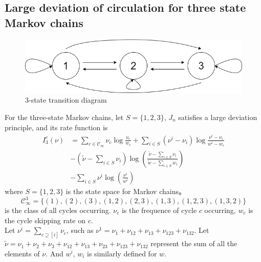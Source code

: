 \documentclass[11pt,en,cite=authoryear]{elegantpaper}
\begin{document}
\subsection{Large deviation of circulation for three state Markov chains}

\begin{theorem}
    \begin{figure}[h]
        \centering
        \includegraphics[scale=0.3]{3-state.png}
        \caption{3-state transition diagram}
    \end{figure}

For the three-state Markov chains, let $S = \{1, 2, 3\}$, $J_{n}$ satisfies a large deviation principle, and its rate function is
\begin{align}
    I_3^c(\nu) &= \sum_{c \in \mathcal{C}_{\infty}} \nu_{c} \log \frac{\nu_{c}}{w_c} + \sum_{i\in S}(\nu^i - \nu_i)\log \frac{\nu^i - \nu_i}{w^i - w_i} \\
    &-(\tilde{\nu} - \sum_{i\in S}\nu_i)\log(\frac{\tilde{\nu} - \sum_{i\in S}\nu_i}{\tilde{w} - \sum_{i\in S}w_i}) \\
    &-\sum_{i\in S} \nu^i \log (\frac{\nu^i}{w^i})
\end{align}
where $S=\{1, 2, 3\}$ is the state space for Markov chains。
$$\mathcal{C}_{\infty}^3 = \{(1), (2), (3), (1,2), (2,3), (1,3), (1,2,3), (1,3,2)\}$$
is the class of all cycles occurring.
$\nu_c$ is the frequence of cycle $c$ occurring, $w_c$ is the cycle skipping rate on $c$.\\
Let $\nu^{i} = \sum_{c \supseteq [i]} \nu_{c}$, such as $\nu^{1} = \nu_{1} + \nu_{12} + \nu_{13} + \nu_{123} +\nu_{132}$.
Let  $\tilde{\nu} = \nu_{1} + \nu_{2} + \nu_{3} + \nu_{12} + \nu_{13} + \nu_{23} + \nu_{123} +\nu_{132}$ represent the sum of all the elements of $\nu$. 
And $w^i$, $w_i$ is similarly defined for $w$.
\end{theorem}
\end{document}
